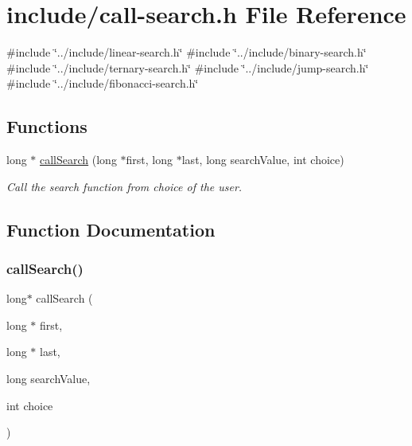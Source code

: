 \hypertarget{call-search_8h}{}\section{include/call-\/search.h File Reference}
\label{call-search_8h}
{\ttfamily \#include \char`\"{}../include/linear-\/search.\+h\char`\"{}}\newline
{\ttfamily \#include \char`\"{}../include/binary-\/search.\+h\char`\"{}}\newline
{\ttfamily \#include \char`\"{}../include/ternary-\/search.\+h\char`\"{}}\newline
{\ttfamily \#include \char`\"{}../include/jump-\/search.\+h\char`\"{}}\newline
{\ttfamily \#include \char`\"{}../include/fibonacci-\/search.\+h\char`\"{}}\newline
\subsection*{Functions}
\begin{DoxyCompactItemize}
\item 
long $\ast$ \mbox{\hyperlink{call-search_8h_aa4c0ed6a64776cb3d018dff7a5077c4b}{call\+Search}} (long $\ast$first, long $\ast$last, long search\+Value, int choice)
\begin{DoxyCompactList}\small\item\em Call the search function from choice of the user. \end{DoxyCompactList}\end{DoxyCompactItemize}


\subsection{Function Documentation}
\mbox{\label{call-search_8h_aa4c0ed6a64776cb3d018dff7a5077c4b}} 
\subsubsection{\texorpdfstring{callSearch()}{callSearch()}}
{\footnotesize\ttfamily long$\ast$ call\+Search (\begin{DoxyParamCaption}\item[{long $\ast$}]{first,  }\item[{long $\ast$}]{last,  }\item[{long}]{search\+Value,  }\item[{int}]{choice }\end{DoxyParamCaption})}



